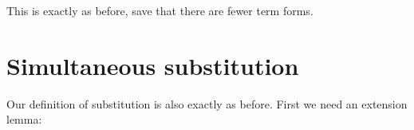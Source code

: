 This is exactly as before, save that there are fewer term forms.

\hypertarget{simultaneous-substitution}{%
\section{Simultaneous substitution}\label{simultaneous-substitution}}

Our definition of substitution is also exactly as before. First we need
an extension lemma:

\begin{fence}
\begin{code}%
\>[0]\AgdaSpace{}%
\AgdaSymbol{:}\AgdaSpace{}%
\AgdaSpace{}%
\AgdaSymbol{\{}\AgdaSpace{}%
\AgdaSymbol{\}}\AgdaSpace{}%
\AgdaSpace{}%
\AgdaSpace{}%
\AgdaSymbol{\{}\AgdaSymbol{\}}\AgdaSpace{}%
\AgdaSpace{}%
\AgdaSpace{}%
\AgdaSpace{}%
\AgdaSpace{}%
\AgdaSpace{}%
\AgdaSpace{}%
\AgdaSpace{}%
\AgdaSymbol{)}\<%
\\
\>[0][@{}l@{\AgdaIndent{0}}]%
\>[4]\AgdaComment{----------------------------------}\<%
\\
\>[0][@{}l@{\AgdaIndent{0}}]%
\>[2]\AgdaSpace{}%
\AgdaSpace{}%
\AgdaSymbol{\{}\AgdaSpace{}%
\AgdaSymbol{\}}\AgdaSpace{}%
\AgdaSpace{}%
\AgdaSpace{}%
\AgdaOperator{\AgdaInductiveConstructor{,}}\AgdaSpace{}%
\AgdaSpace{}%
\AgdaSpace{}%
\AgdaSpace{}%
\AgdaSpace{}%
\AgdaSpace{}%
\AgdaOperator{\AgdaInductiveConstructor{,}}\AgdaSpace{}%
\AgdaSpace{}%
\AgdaSpace{}%
\AgdaSymbol{)}\<%
\\
\>[0]\AgdaSpace{}%
\AgdaSpace{}%
%
\>[14]\AgdaSymbol{=}%
\>[17]\AgdaSpace{}%
\<%
\\
\>[0]\AgdaSpace{}%
\AgdaSpace{}%
\AgdaSymbol{(}\AgdaSpace{}%
\AgdaSymbol{)}%
\>[14]\AgdaSymbol{=}%
\>[17]\AgdaSpace{}%
\AgdaSpace{}%
\AgdaSymbol{(}\AgdaSpace{}%
\AgdaSymbol{)}\<%
\end{code}
\end{fence}

